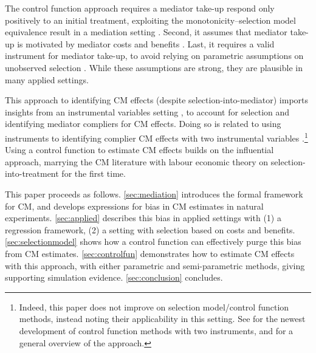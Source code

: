 The control function approach requires a mediator take-up respond only positively to an initial treatment, exploiting the monotonicity--selection model equivalence result in a mediation setting \citep{vytlacil2002independence}.
Second, it assumes that mediator take-up is motivated by mediator costs and benefits \citep{florens2008identification}.
Last, it requires a valid instrument for mediator take-up, to avoid relying on parametric assumptions on unobserved selection \citep{heckman2004using}.
While these assumptions are strong, they are plausible in many applied settings.

This approach to identifying CM effects (despite selection-into-mediator) imports insights from an instrumental variables setting \citep{kline2019heckits,heckman2005structural}, to account for selection and identifying mediator compliers for CM effects.
Doing so is related to using instruments to identifying complier CM effects with two instrumental variables \citep{frolich2017direct}.\footnote{
    Indeed, this paper does not improve on selection model/control function methods, instead noting their applicability in this setting.
    See \cite{frolich2017direct} for the newest development of control function methods with two instruments, and \cite{wooldridge2015control} for a general overview of the approach.
}
Using a control function to estimate CM effects builds on the influential \cite{imai2010identification} approach, marrying the CM literature with labour economic theory on selection-into-treatment for the first time. 

This paper proceeds as follows.
\autoref{sec:mediation} introduces the formal framework for CM, and develops expressions for bias in CM estimates in natural experiments.
\autoref{sec:applied} describes this bias in applied settings with (1) a regression framework, (2) a setting with selection based on costs and benefits.
\autoref{sec:selectionmodel} shows how a control function can effectively purge this bias from CM estimates.
\autoref{sec:controlfun} demonstrates how to estimate CM effects with this approach, with either parametric and semi-parametric methods, giving supporting simulation evidence.
\autoref{sec:conclusion} concludes.
